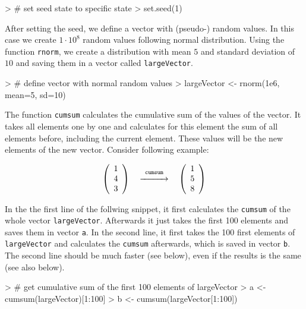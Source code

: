 \documentclass{article}
\begin{document}
\begin{Schunk}
\begin{Sinput}
> # set seed state to specific state
> set.seed(1)
\end{Sinput}
\end{Schunk}

After setting the seed, we define a vector with (pseudo-) random values. In this case we create $1 \cdot 10^8$ random values following normal distribution. Using the function \texttt{rnorm}, we create a distribution with mean $5$ and standard deviation of $10$ and saving them in a vector called \texttt{largeVector}.


\begin{Schunk}
\begin{Sinput}
> # define vector with normal random values
> largeVector <- rnorm(1e6, mean=5, sd=10)
\end{Sinput}
\end{Schunk}

The function \texttt{cumsum} calculates the cumulative sum of the values of the vector. It takes all elements one by one and calculates for this element the sum of all elements before, including the current element. These values will be the new elements of the new vector. Consider following example:

$$
\left(\begin{array}{ccc}1\\ 4\\ 3\end{array}\right) \quad \overset{\texttt{cumsum}}{\xrightarrow{\hspace*{1cm}}} \quad \left(\begin{array}{ccc}1\\ 5\\ 8\end{array}\right)
$$

In the the first line of the follwing snippet, it first calculates the \texttt{cumsum} of the whole vector \texttt{largeVector}. Afterwards it just takes the first 100 elements and saves them in vector \texttt{a}. In the second line, it first takes the 100 first elements of \texttt{largeVector} and calculates the \texttt{cumsum} afterwards, which is saved in vector \texttt{b}. The second line should be much faster (see below), even if the results is the same (see also below).

\begin{Schunk}
\begin{Sinput}
> # get cumulative sum of the first 100 elements of largeVector
> a <- cumsum(largeVector)[1:100]
> b <- cumsum(largeVector[1:100])
\end{Sinput}
\end{Schunk}
\end{document}
